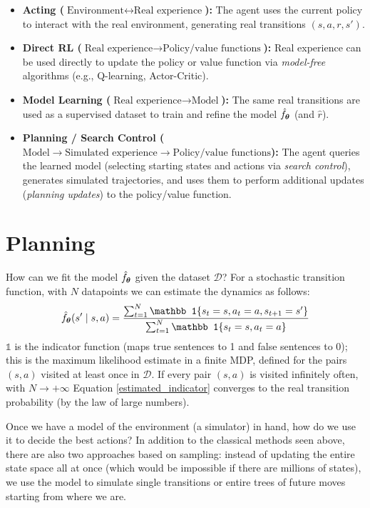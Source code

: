 \documentclass[10pt, a4paper]{report}
\begin{document}
\begin{itemize}
    \item \textbf{Acting ($\text{Environment} \leftrightarrow \text{Real experience}$):} The agent uses the current policy to interact with the real environment, generating real transitions $(s, a, r, s')$.
    \item \textbf{Direct RL ($\text{Real experience} \rightarrow \text{Policy/value functions}$):} Real experience can be used directly to update the policy or value function via \emph{model-free} algorithms (e.g., Q-learning, Actor-Critic).
    \item \textbf{Model Learning ($\text{Real experience} \rightarrow \text{Model}$):} The same real transitions are used as a supervised dataset to train and refine the model $\hat f_{\boldsymbol{\theta}}$ (and $\hat{r}$).
    \item \textbf{Planning / Search Control ($\text{Model} \rightarrow \text{Simulated experience} \rightarrow \text{Policy/value functions}$):} The agent queries the learned model (selecting starting states and actions via \emph{search control}), generates simulated trajectories, and uses them to perform additional updates (\emph{planning updates}) to the policy/value function.
\end{itemize}
\section{Planning}
How can we fit the model $\hat f_{\boldsymbol{\theta}}$ given the dataset $\mathcal D$? For a stochastic transition function, with $N$ datapoints we can estimate the dynamics as follows:\begin{equation}\label{estimated_indicator}
    \hat f_\btheta(s'\mid s,a)=\frac{
        \sum_{t=1}^{N}\mathbb 1\{s_t=s,a_t=a,s_{t+1}=s'\}
    }{
        \sum_{t=1}^{N}\mathbb 1\{s_t=s,a_t=a\}
    }
\end{equation}
$\mathbb 1$ is the indicator function (maps true sentences to 1 and false sentences to 0); this is the maximum likelihood estimate in a finite MDP, defined for the pairs $(s,a)$ visited at least once in $\mathcal D$. If every pair $(s,a)$ is visited infinitely often, with $N\rightarrow+\infty$ Equation \eqref{estimated_indicator} converges to the real transition probability (by the law of large numbers).\bigskip

Once we have a model of the environment (a simulator) in hand, how do we use it to decide the best actions? In addition to the classical methods seen above, there are also two approaches based on sampling: instead of updating the entire state space all at once (which would be impossible if there are millions of states), we use the model to simulate single transitions or entire trees of future moves starting from where we are.
\end{document}
